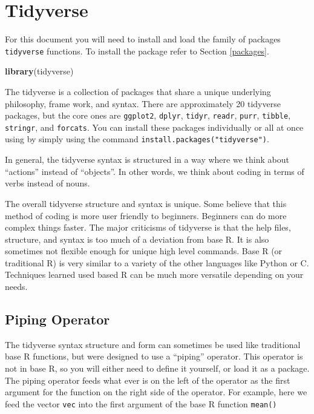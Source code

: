 \documentclass[
]{book}
\newenvironment{Shaded}{\begin{snugshade}}{\end{snugshade}}
\newcommand{\KeywordTok}[1]{\textcolor[rgb]{0.13,0.29,0.53}{\textbf{#1}}}
\newcommand{\NormalTok}[1]{#1}
\begin{document}
\hypertarget{tidyverse}{%
\chapter{Tidyverse}\label{tidyverse}}

For this document you will need to install and load the family of packages \texttt{tidyverse} functions. To install the package refer to Section \ref{packages}.

\begin{Shaded}
\begin{Highlighting}[]
\KeywordTok{library}\NormalTok{(tidyverse)}
\end{Highlighting}
\end{Shaded}

The tidyverse is a collection of packages that share a unique underlying philosophy, frame work, and syntax. There are approximately 20 tidyverse packages, but the core ones are \texttt{ggplot2}, \texttt{dplyr}, \texttt{tidyr}, \texttt{readr}, \texttt{purr}, \texttt{tibble}, \texttt{stringr}, and \texttt{forcats}. You can install these packages individually or all at once using by simply using the command \texttt{install.packages("tidyverse")}.

In general, the tidyverse syntax is structured in a way where we think about ``actions'' instead of ``objects''. In other words, we think about coding in terms of verbs instead of nouns.

The overall tidyverse structure and syntax is unique. Some believe that this method of coding is more user friendly to beginners. Beginners can do more complex things faster. The major criticisms of tidyverse is that the help files, structure, and syntax is too much of a deviation from base R. It is also sometimes not flexible enough for unique high level commands. Base R (or traditional R) is very similar to a variety of the other languages like Python or C. Techniques learned used based R can be much more versatile depending on your needs.

\hypertarget{piping-operator}{%
\section{Piping Operator}\label{piping-operator}}

The tidyverse syntax structure and form can sometimes be used like traditional base R functions, but were designed to use a ``piping'' operator. This operator is not in base R, so you will either need to define it yourself, or load it as a package. The piping operator feeds what ever is on the left of the operator as the first argument for the function on the right side of the operator. For example, here we feed the vector \texttt{vec} into the first argument of the base R function \texttt{mean()}
\end{document}
